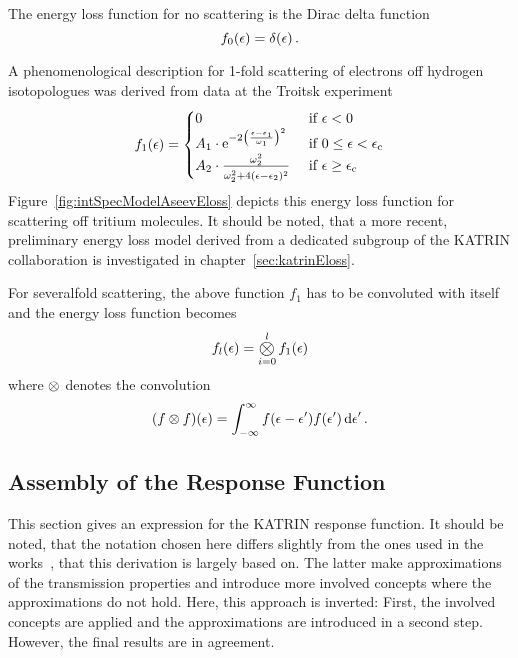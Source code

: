 The energy loss function for no scattering is the Dirac delta function~\cite{Kleesiek2019}
\begin{equation}
f_0(\epsilon) = \delta(\epsilon)
\text{\,.}
\end{equation}

A phenomenological description for 1-fold scattering of electrons off hydrogen isotopologues was derived from data at the Troitsk experiment~\cite{Aseev2000, Abdurashitov2017}
\begin{equation}
\label{eq:intSpecModelAseevEloss}
	f_1(\epsilon) =
	\begin{cases}
		0 &\text{ if } \epsilon < 0 \\
		A_1 \cdot
		\euler^{ 
			-2\left(
			\frac{\epsilon-\epsilon_1}{\omega_1}
			\right)^2
		}
		&\text{ if } 0 \leq \epsilon < \epsCrit \\
		A_2 \cdot
		\frac{
			\omega_2^2
		}{
			\omega_2^2+4(\epsilon-\epsilon_2)^2 
			\vphantom{\text{\large A}}
		} 
		&\text{ if } \epsilon \geq \epsCrit
	\end{cases}
\end{equation}
Figure~\ref{fig:intSpecModelAseevEloss} depicts this energy loss function for scattering off tritium molecules. It should be noted, that a more recent, preliminary energy loss model derived from a dedicated subgroup of the KATRIN collaboration is investigated in chapter~\ref{sec:katrinEloss}.

For severalfold scattering, the above function $f_1$ has to be convoluted with itself and the energy loss function becomes~\cite{Kleesiek2019}
\begin{equation}
	\label{eq:intSpecModelConvolutedEloss}
	f_l(\epsilon) = \Conv_{i=0}^{l} f_1(\epsilon)
\end{equation}
where $\otimes$ denotes the convolution
\begin{equation}
(f \otimes f)(\epsilon) = 
\int_{-\infty}^{\infty}  
	f(\epsilon-\epsilon^\prime)f(\epsilon^\prime)
\mathop{}\!\mathrm{d} \epsilon^\prime 
\text{\,.} 
\end{equation}

\subsection{Assembly of the Response Function}
\label{sec:intSpecModelResponseReconciliation}
This section gives an expression for the KATRIN response function. It should be noted, that the notation chosen here differs slightly from the ones used in the works~\cite{Groh2015,Kleesiek2019}, that this derivation is largely based on. The latter make approximations of the transmission properties and introduce more involved concepts where the approximations do not hold. Here, this approach is inverted: First, the involved concepts are applied and the approximations are introduced in a second step. However, the final results are in agreement.

